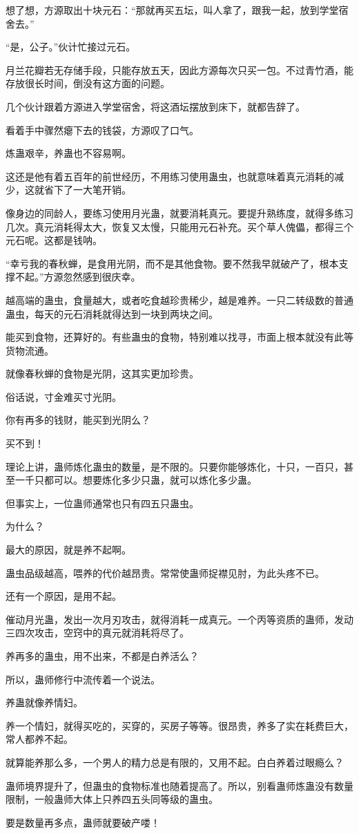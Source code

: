 \begin{this_body}
想了想，方源取出十块元石：“那就再买五坛，叫人拿了，跟我一起，放到学堂宿舍去。”

“是，公子。”伙计忙接过元石。

月兰花瓣若无存储手段，只能存放五天，因此方源每次只买一包。不过青竹酒，能存放很长时间，倒没有这方面的问题。

几个伙计跟着方源进入学堂宿舍，将这酒坛摆放到床下，就都告辞了。

看着手中骤然瘪下去的钱袋，方源叹了口气。

炼蛊艰辛，养蛊也不容易啊。

这还是他有着五百年的前世经历，不用练习使用蛊虫，也就意味着真元消耗的减少，这就省下了一大笔开销。

像身边的同龄人，要练习使用月光蛊，就要消耗真元。要提升熟练度，就得多练习几次。真元消耗得太大，恢复又太慢，只能用元石补充。买个草人傀儡，都得三个元石呢。这都是钱呐。

“幸亏我的春秋蝉，是食用光阴，而不是其他食物。要不然我早就破产了，根本支撑不起。”方源忽然感到很庆幸。

越高端的蛊虫，食量越大，或者吃食越珍贵稀少，越是难养。一只二转级数的普通蛊虫，每天的元石消耗就得达到一块到两块之间。

能买到食物，还算好的。有些蛊虫的食物，特别难以找寻，市面上根本就没有此等货物流通。

就像春秋蝉的食物是光阴，这其实更加珍贵。

俗话说，寸金难买寸光阴。

你有再多的钱财，能买到光阴么？

买不到！

理论上讲，蛊师炼化蛊虫的数量，是不限的。只要你能够炼化，十只，一百只，甚至一千只都可以。想要炼化多少只蛊，就可以炼化多少蛊。

但事实上，一位蛊师通常也只有四五只蛊虫。

为什么？

最大的原因，就是养不起啊。

蛊虫品级越高，喂养的代价越昂贵。常常使蛊师捉襟见肘，为此头疼不已。

还有一个原因，是用不起。

催动月光蛊，发出一次月刃攻击，就得消耗一成真元。一个丙等资质的蛊师，发动三四次攻击，空窍中的真元就消耗将尽了。

养再多的蛊虫，用不出来，不都是白养活么？

所以，蛊师修行中流传着一个说法。

养蛊就像养情妇。

养一个情妇，就得买吃的，买穿的，买房子等等。很昂贵，养多了实在耗费巨大，常人都养不起。

就算能养那么多，一个男人的精力总是有限的，又用不起。白白养着过眼瘾么？

蛊师境界提升了，但蛊虫的食物标准也随着提高了。所以，别看蛊师炼蛊没有数量限制，一般蛊师大体上只养四五头同等级的蛊虫。

要是数量再多点，蛊师就要破产喽！

\end{this_body}

